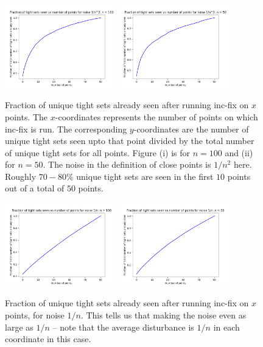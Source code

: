 \documentclass{article}
\begin{document}
\begin{figure}
    \centering
    \includegraphics[width=0.43\textwidth]{code/figures/n=100-fraction-of-tight-sets-seen-noise-1-by-n^2.png}
    \includegraphics[width=0.43\textwidth]{code/figures/n=50-fraction-of-tight-sets-seen-noise-1-by-n^2.png}
    \caption{Fraction of unique tight sets already seen after running inc-fix on $x$ points. The $x$-coordinates represents the number of points on which inc-fix is run. The corresponding $y$-coordinates are the number of unique tight sets seen upto that point divided by the total number of unique tight sets for all points. Figure (i) is for $n = 100$ and (ii) for $n = 50$. The noise in the definition of close points is $1/n^2$ here. Roughly $70-80 \%$ unique tight sets are seen in the first $10$ points out of a total of $50$ points.}
    \label{fig:my_label}
\end{figure}

\begin{figure}
    \centering
    \includegraphics[width=0.43\textwidth]{code/figures/n=100-fraction-of-tight-sets-seen-noise-1-by-n.png}
    \includegraphics[width=0.43\textwidth]{code/figures/n=50-fraction-of-tight-sets-seen-noise-1-by-n.png}
    \caption{Fraction of unique tight sets already seen after running inc-fix on $x$ points, for noise $1/n$. This tells us that making the noise even as large as $1/n$ -- note that the average disturbance is $1/n$ in each coordinate in this case.}
    \label{fig:my_label}
\end{figure}
\end{document}
